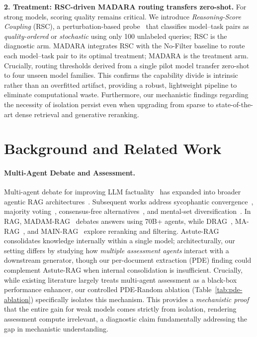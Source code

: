 \documentclass[11pt]{article}
\theoremstyle{definition}
\begin{document}
\noindent\textbf{2. Treatment: RSC-driven MADARA routing transfers zero-shot.} For strong models, scoring quality remains critical. We introduce \emph{Reasoning-Score Coupling} (RSC), a perturbation-based probe~\citep{lanham2023measuring, paul2024making} that classifies model--task pairs as \emph{quality-ordered} or \emph{stochastic} using only 100 unlabeled queries; RSC is the diagnostic arm. MADARA integrates RSC with the No-Filter baseline to route each model--task pair to its optimal treatment; MADARA is the treatment arm. Crucially, routing thresholds derived from a single pilot model transfer zero-shot to four unseen model families. This confirms the capability divide is intrinsic rather than an overfitted artifact, providing a robust, lightweight pipeline to eliminate computational waste. Furthermore, our mechanistic findings regarding the necessity of isolation persist even when upgrading from sparse to state-of-the-art dense retrieval and generative reranking.


\section{Background and Related Work}
\label{sec:related}

\paragraph{Multi-Agent Debate and Assessment.}
Multi-agent debate for improving LLM factuality~\citep{du2024improving} has expanded into broader agentic RAG architectures~\citep{singh2025agentic}. Subsequent works address sycophantic convergence~\citep{liang2024encouraging, jain2025beyond, pitre2025consensagent, zhu2026demystifying}, majority voting~\citep{smit2023should}, consensus-free alternatives~\citep{cui2025free}, and mental-set diversification~\citep{liu2025breaking}. In RAG, MADAM-RAG~\citep{wang2025retrieval} debates answers using 70B+ agents, while DRAG~\citep{hu2025removal}, MA-RAG~\citep{nguyen2025ma}, and MAIN-RAG~\citep{chang2025main} explore reranking and filtering. Astute-RAG~\citep{wang2025astute} consolidates knowledge internally within a single model; architecturally, our setting differs by studying how \emph{multiple assessment agents} interact with a downstream generator, though our per-document extraction (PDE) finding could complement Astute-RAG when internal consolidation is insufficient. Crucially, while existing literature largely treats multi-agent assessment as a black-box performance enhancer, our controlled PDE-Random ablation (Table~\ref{tab:pde-ablation}) specifically isolates this mechanism. This provides a \emph{mechanistic proof} that the entire gain for weak models comes strictly from isolation, rendering assessment compute irrelevant, a diagnostic claim fundamentally addressing the gap in mechanistic understanding.
\end{document}
